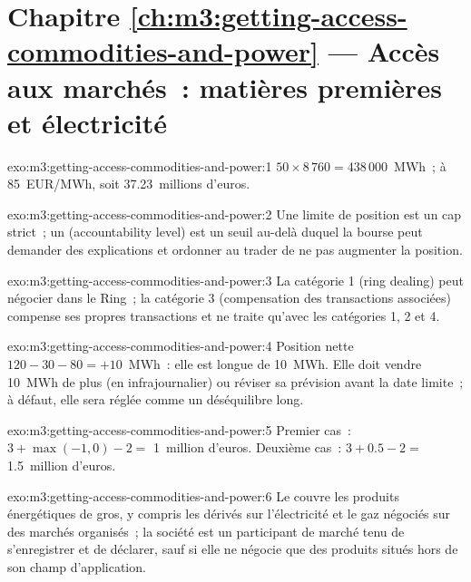 \section*{Chapitre \ref{ch:m3:getting-access-commodities-and-power} --- Accès aux marchés~: matières premières et électricité}

\begin{solution}{exo:m3:getting-access-commodities-and-power:1}
$50 \times 8\,760 = 438\,000$~MWh~; à \qty{85}{EUR/MWh}, soit 37.23~millions d'euros.
\end{solution}

\begin{solution}{exo:m3:getting-access-commodities-and-power:2}
Une limite de position est un cap strict~; un  (accountability level) est un seuil au-delà duquel la bourse peut demander
des explications et ordonner au trader de ne pas augmenter la position.
\end{solution}

\begin{solution}{exo:m3:getting-access-commodities-and-power:3}
La catégorie 1 (ring dealing) peut négocier dans le Ring~; la catégorie 3 (compensation des transactions associées) compense ses propres transactions
et ne traite qu'avec les catégories 1, 2 et 4.
\end{solution}

\begin{solution}{exo:m3:getting-access-commodities-and-power:4}
Position nette $120 - 30 - 80 = +10$~MWh~: elle est longue de 10~MWh. Elle doit vendre 10~MWh de plus (en infrajournalier) ou réviser sa prévision
avant la date limite~; à défaut, elle sera réglée comme un déséquilibre long.
\end{solution}

\begin{solution}{exo:m3:getting-access-commodities-and-power:5}
Premier cas~: $3 + \max(-1, 0) - 2 = $ 1~million d'euros. Deuxième cas~: $3 + 0.5 - 2 = $ 1.5~million d'euros.
\end{solution}

\begin{solution}{exo:m3:getting-access-commodities-and-power:6}
Le  couvre les produits énergétiques de gros, y compris les dérivés sur l'électricité et le gaz négociés sur des marchés organisés~; la société est un participant de marché tenu de s'enregistrer et de déclarer,
sauf si elle ne négocie que des produits
situés hors de son champ d'application.
\end{solution}

